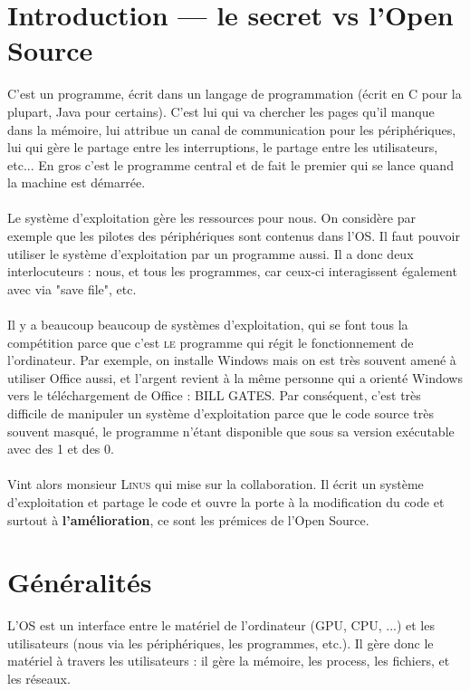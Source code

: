 \documentclass[12pt,a4paper]{report}
\begin{document}
\section{Introduction --- le secret vs l'Open Source}
C'est un programme, écrit dans un langage de programmation (écrit en C pour la plupart, Java pour certains). C'est lui qui va chercher les pages qu'il manque dans la mémoire, lui attribue un canal de communication pour les périphériques, lui qui gère le partage entre les interruptions, le partage entre les utilisateurs, etc... En gros c'est le programme central et de fait le premier qui se lance quand la machine est démarrée. \\
\\
Le système d'exploitation gère les ressources pour nous. On considère par exemple que les pilotes des périphériques sont contenus dans l'OS. Il faut pouvoir utiliser le système d'exploitation par un programme aussi. Il a donc deux interlocuteurs : nous, et tous les programmes, car ceux-ci interagissent également avec via "save file", etc.\\
\\
Il y a  beaucoup beaucoup de systèmes d'exploitation, qui se font tous la compétition parce que c'est \textsc{le} programme qui régit le fonctionnement de l'ordinateur. Par exemple, on installe Windows mais on est très souvent amené à utiliser Office aussi, et l'argent revient à la même personne qui a orienté Windows vers le téléchargement de Office : BILL GATES. Par conséquent, c'est très difficile de manipuler un système d'exploitation parce que le code source très souvent masqué, le programme n'étant disponible que sous sa version exécutable avec des 1 et des 0.\\
\\
Vint alors monsieur \textsc{Linus} qui mise sur la collaboration. Il écrit un système d'exploitation et partage le code et ouvre la porte à la modification du code et surtout à \textbf{l'amélioration}, ce sont les prémices de l'Open Source.

\section{Généralités}
L'OS est un interface entre le matériel de l'ordinateur (GPU, CPU, ...) et les utilisateurs (nous via les périphériques, les programmes, etc.). Il gère donc le matériel à travers les utilisateurs : il gère la mémoire, les process, les fichiers, et les réseaux.
\end{document}
